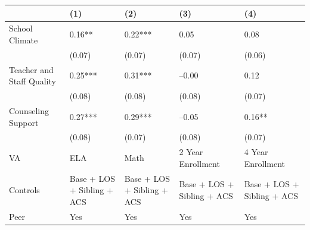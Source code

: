 \documentclass{article}
\begin{document}
\begin{table}[tbp] \centering
{}

{\footnotesize
\begin{tabularx}{\linewidth}{lCCCC}

\toprule
&{(1)}&{(2)}&{(3)}&{(4)} \tabularnewline
\midrule \addlinespace[\belowrulesep]
School Climate&0.16**&0.22***&0.05&0.08 \tabularnewline
&(0.07)&(0.07)&(0.07)&(0.06) \tabularnewline
Teacher and Staff Quality&0.25***&0.31***&--0.00&0.12 \tabularnewline
&(0.08)&(0.08)&(0.08)&(0.07) \tabularnewline
Counseling Support&0.27***&0.29***&--0.05&0.16** \tabularnewline
&(0.08)&(0.07)&(0.08)&(0.07) \tabularnewline
\midrule VA&ELA&Math&2 Year Enrollment&4 Year Enrollment \tabularnewline
Controls&Base + LOS + Sibling + ACS&Base + LOS + Sibling + ACS&Base + LOS + Sibling + ACS&Base + LOS + Sibling + ACS \tabularnewline
Peer&Yes&Yes&Yes&Yes \tabularnewline
\bottomrule 

\end{tabularx}
}
\end{table}
\end{document}
